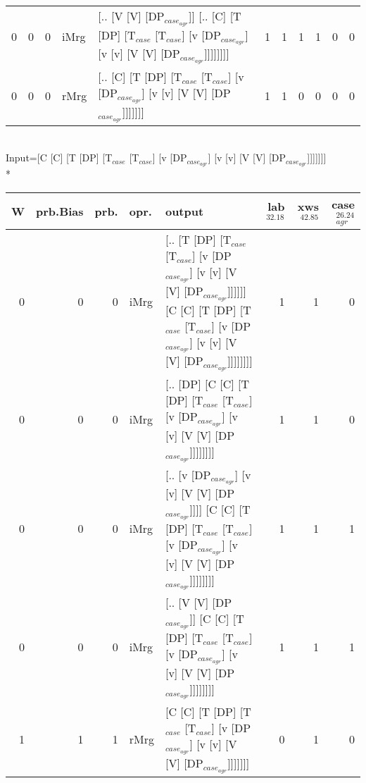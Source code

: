 \begin{tabularx}{\linewidth}{rrrlXrrrrrr}
   0 &       0 &   0 & iMrg & [.. [V [V] [DP$_{case_{agr}}$]] [.. [C] [T [DP] [T$_{case}$ [T$_{case}$] [v [DP$_{case_{agr}}$] [v [v] [V [V] [DP$_{case_{agr}}$]]]]]]]]                                                      &             1 &             1 &                  1 &            1 &              0 &             0 \\
   0 &       0 &   0 & rMrg & [.. [C] [T [DP] [T$_{case}$ [T$_{case}$] [v [DP$_{case_{agr}}$] [v [v] [V [V] [DP$_{case_{agr}}$]]]]]]]                                                                                 &             1 &             1 &                  0 &            0 &              0 &             0 \\
\hline
\end{tabularx}\endgroup\\
\begingroup\scriptsize Input=[C [C] [T [DP] [T$_{case}$ [T$_{case}$] [v [DP$_{case_{agr}}$] [v [v] [V [V] [DP$_{case_{agr}}$]]]]]]]\\*
\begin{tabularx}{\linewidth}{rrrlXrrr}
\hline
   W &   prb.Bias &   prb. & opr.   & output                                                                                                                                                             &   lab$^{32.18}$ &   xws$^{42.85}$ &   case$_{agr}^{26.24}$ \\
\hline
   0 &       0 &   0 & iMrg & [.. [T [DP] [T$_{case}$ [T$_{case}$] [v [DP$_{case_{agr}}$] [v [v] [V [V] [DP$_{case_{agr}}$]]]]]] [C [C] [T [DP] [T$_{case}$ [T$_{case}$] [v [DP$_{case_{agr}}$] [v [v] [V [V] [DP$_{case_{agr}}$]]]]]]]] &             1 &             1 &                  0 \\
   0 &       0 &   0 & iMrg & [.. [DP] [C [C] [T [DP] [T$_{case}$ [T$_{case}$] [v [DP$_{case_{agr}}$] [v [v] [V [V] [DP$_{case_{agr}}$]]]]]]]]                                                                       &             1 &             1 &                  0 \\
   0 &       0 &   0 & iMrg & [.. [v [DP$_{case_{agr}}$] [v [v] [V [V] [DP$_{case_{agr}}$]]]] [C [C] [T [DP] [T$_{case}$ [T$_{case}$] [v [DP$_{case_{agr}}$] [v [v] [V [V] [DP$_{case_{agr}}$]]]]]]]]                            &             1 &             1 &                  1 \\
   0 &       0 &   0 & iMrg & [.. [V [V] [DP$_{case_{agr}}$]] [C [C] [T [DP] [T$_{case}$ [T$_{case}$] [v [DP$_{case_{agr}}$] [v [v] [V [V] [DP$_{case_{agr}}$]]]]]]]]                                                      &             1 &             1 &                  1 \\
   1 &       1 &   1 & rMrg & [C [C] [T [DP] [T$_{case}$ [T$_{case}$] [v [DP$_{case_{agr}}$] [v [v] [V [V] [DP$_{case_{agr}}$]]]]]]]                                                                                 &             0 &             1 &                  0 \\
\hline
\end{tabularx}\endgroup\\
